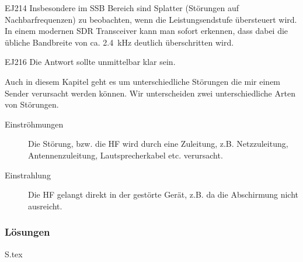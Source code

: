 \documentclass[10pt,a4paper,ngerman]{article}
\theoremstyle{definition}
\theoremstyle{plain}
\theoremstyle{mytheorem}
\theoremstyle{definition}
\newenvironment{ohmchapter}{}
{
  \subsubsection*{Lösungen}
  S\arabic{subsection}.tex}
}
\begin{document}
\begin{sol}{EJ214}
Insbesondere im SSB Bereich sind Splatter (Störungen auf Nachbarfrequenzen) zu beobachten, wenn die Leistungsendstufe übersteuert wird. In einem modernen SDR Transceiver kann man sofort erkennen, dass dabei die 
übliche Bandbreite von ca. \SI{2.4} {\kilo\hertz }  deutlich überschritten wird.
\end{sol}

\begin{sol}{EJ216}
  Die Antwort sollte unmittelbar klar sein.
\end{sol}


\begin{ohmchapter}
Auch in diesem Kapitel geht es um unterschiedliche Störungen die mir einem Sender verursacht werden können.
Wir unterscheiden zwei unterschiedliche Arten von Störungen.

\begin{description}
  \item[Einströhmungen] Die Störung, bzw. die HF wird durch eine Zuleitung, z.B. Netzzuleitung, Antennenzuleitung, Lautsprecherkabel etc. verursacht. 
  \item[Einstrahlung] Die HF gelangt direkt in der gestörte Gerät, z.B. da die Abschirmung nicht ausreicht.
\end{description}





\end{ohmchapter}
\end{document}
